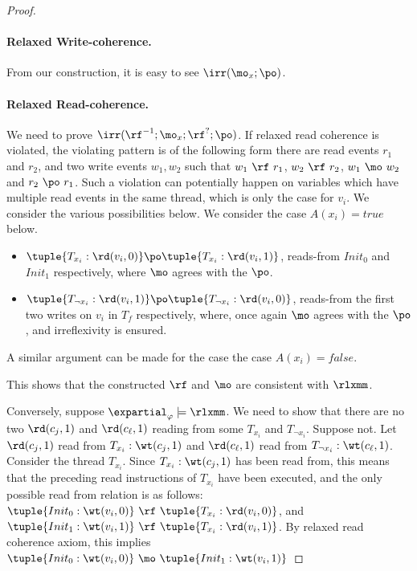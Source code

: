 \begin{proof}
    \paragraph*{Relaxed Write-coherence.} From our construction, it is easy to see $\irr(\mo_x; \po)$.

    \paragraph*{Relaxed Read-coherence.} We need to prove  $\irr(\rf^{-1}; \mo_x; \rf^{?}; \po)$. 
    If relaxed read coherence is violated, the violating pattern is of the following form there are read events $r_1$ and $r_2$, and two write events $w_1, w_2$ such that $w_1~\rf~r_1$, $w_2~\rf~r_2$, $w_1~\mo~w_2$ and $r_2~\po~r_1$.
    Such a violation can potentially happen on variables which have multiple read events in the same thread, which is only the case for $v_i$.
    We consider the various possibilities below. 
    We consider the case $A(x_i) = true$ below. 
        \begin{itemize}[leftmargin=0.1em]
            \item $\tuple{T_{x_i}: \rd(v_i, 0)} \po \tuple{T_{x_i}: \rd(v_i, 1)}$, reads-from $Init_0$ and $Init_1$ respectively, where $\mo$ agrees with the $\po$.
            \item $\tuple{T_{\neg x_i}: \rd(v_i, 1)} \po \tuple{T_{\neg x_i}: \rd(v_i, 0)}$, reads-from the first two writes on $v_i$ in $T_f$ respectively, where, once again $\mo$ agrees with the $\po$, and irreflexivity is ensured.
        \end{itemize}
        A similar argument can be made for the case the case $A(x_i) = false$.

    This shows that the constructed $\rf$ and $\mo$ are consistent with $\rlxmm$. 
    
    Conversely, suppose $\expartial_\varphi \models \rlxmm$. 
    We need to show that there are no two $\rd(c_j, 1)$ and $\rd(c_\ell, 1)$ reading from some $T_{x_i}$ and $T_{\neg x_i}$.
    Suppose not. 
    Let $\rd(c_j, 1)$ read from $T_{x_i}: \wt(c_j, 1)$ and $\rd(c_\ell, 1)$ read from $T_{\neg x_i}: \wt(c_\ell, 1)$.    
    Consider the thread $T_{x_i}$. Since $T_{x_i}: \wt(c_j, 1)$ has been read from, this means that the preceding read instructions of $T_{x_i}$ have been executed, and the only possible read from relation is as follows: 
    $\tuple{Init_0: \wt(v_i, 0)}~\rf~\tuple{T_{x_i}: \rd(v_i, 0)}$,
    and $\tuple{Init_1: \wt(v_i, 1)}~\rf~\tuple{T_{x_i}: \rd(v_i, 1)}$. 
    By relaxed read coherence axiom, this implies $\tuple{Init_0: \wt(v_i, 0)} ~\mo~\tuple{Init_1: \wt(v_i, 1)}$    


\end{proof}
